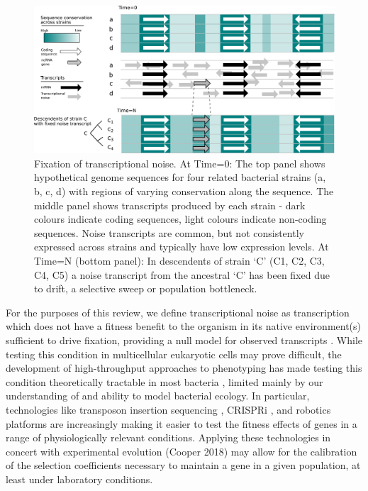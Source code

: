 \begin{figure}[H]
  \includegraphics[scale=0.5]{lit_review/transcriptional_noise.png}
  \caption{Fixation of transcriptional noise. At Time=0: The top panel shows hypothetical genome sequences for four related bacterial strains (a, b, c, d) with regions of varying conservation along the sequence. The middle panel shows transcripts produced by each strain - dark colours indicate coding sequences, light colours indicate non-coding sequences. Noise transcripts are common, but not consistently expressed across strains and typically have low expression levels. At Time=N (bottom panel): In descendents of strain ‘C’ (C1, C2, C3, C4, C5) a noise transcript from the ancestral ‘C’ has been fixed due to drift, a selective sweep or population bottleneck.}
  \label{fig:transcriptional_noise}
\end{figure}

For the purposes of this review, we define transcriptional noise as transcription which does not have a fitness benefit to the organism in its native environment(s) sufficient to drive fixation, providing a null model for observed transcripts \citep{Koonin2016-wg}. While testing this condition in multicellular eukaryotic cells may prove difficult, the development of high-throughput approaches to phenotyping has made testing this condition theoretically tractable in most bacteria \citep{Gray2015-fv,Brochado2013-xy}, limited mainly by our understanding of and ability to model bacterial ecology. In particular, technologies like transposon insertion sequencing \citep{Chao2016-df}, CRISPRi \citep{Peters2015-qv}, and robotics platforms \citep{Kritikos2017-ym} are increasingly making it easier to test the fitness effects of genes in a range of physiologically relevant conditions. Applying these technologies in concert with experimental evolution (Cooper 2018) may allow for the calibration of the selection coefficients necessary to maintain a gene in a given population, at least under laboratory conditions.
 
